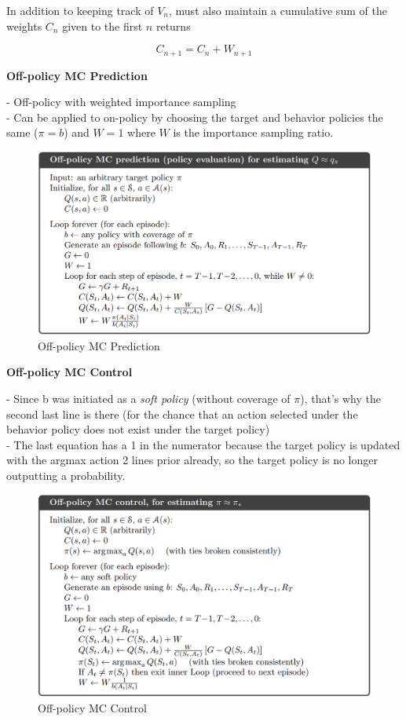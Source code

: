 \documentclass{article}
\begin{document}
\noindent
In addition to keeping track of $V_{n}$, must also maintain a cumulative sum of
the weights $C_{n}$ given to the first $n$ returns

\begin{equation}
C_{n+1}=C_{n}+W_{n+1}
\end{equation}

\newpage
\noindent
\textbf{Off-policy MC Prediction}

\noindent
- Off-policy with weighted importance sampling\\ 
- Can be applied to on-policy by choosing the target and behavior policies the
same ($\pi = b$) and $W = 1$ where $W$ is the importance sampling ratio.

\begin{figure}[h]
\includegraphics[scale=0.25]{offpolicy_mc_prediction}
\centering
\caption{Off-policy MC Prediction}
\end{figure}

\noindent
\textbf{Off-policy MC Control}

\noindent
- Since b was initiated as a \textit{soft policy} (without coverage of $\pi$),
that's why the second last line is there (for the chance that an action selected
under the behavior policy does not exist under the target policy)\\
- The last equation has a 1 in the numerator because the target policy is
updated with the argmax action 2 lines prior already, so the target policy is no
longer outputting a probability.\\

\begin{figure}[h]
\includegraphics[scale=0.25]{offpolicy_mc_control}
\centering
\caption{Off-policy MC Control}
\end{figure}
\end{document}
